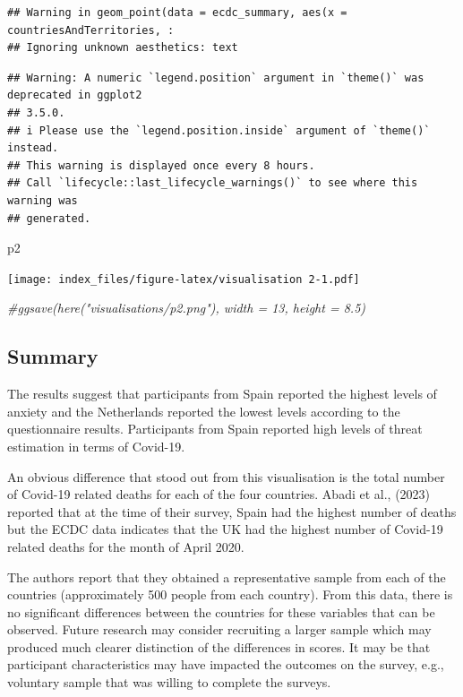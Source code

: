 \documentclass[
]{article}
\newenvironment{Shaded}{\begin{snugshade}}{\end{snugshade}}
\newcommand{\CommentTok}[1]{\textcolor[rgb]{0.56,0.35,0.01}{\textit{#1}}}
\newcommand{\NormalTok}[1]{#1}
\begin{document}
\begin{verbatim}
## Warning in geom_point(data = ecdc_summary, aes(x = countriesAndTerritories, :
## Ignoring unknown aesthetics: text
\end{verbatim}

\begin{verbatim}
## Warning: A numeric `legend.position` argument in `theme()` was deprecated in ggplot2
## 3.5.0.
## i Please use the `legend.position.inside` argument of `theme()` instead.
## This warning is displayed once every 8 hours.
## Call `lifecycle::last_lifecycle_warnings()` to see where this warning was
## generated.
\end{verbatim}

\begin{Shaded}
\begin{Highlighting}[]
\NormalTok{p2}
\end{Highlighting}
\end{Shaded}

\texttt{[image: index\_files/figure-latex/visualisation 2-1.pdf]}

\begin{Shaded}
\begin{Highlighting}[]
\CommentTok{\#ggsave(here("visualisations/p2.png"), width = 13, height = 8.5)}
\end{Highlighting}
\end{Shaded}

\subsection{Summary}\label{summary}

The results suggest that participants from Spain reported the highest
levels of anxiety and the Netherlands reported the lowest levels
according to the questionnaire results. Participants from Spain reported
high levels of threat estimation in terms of Covid-19.

An obvious difference that stood out from this visualisation is the
total number of Covid-19 related deaths for each of the four countries.
Abadi et al., (2023) reported that at the time of their survey, Spain
had the highest number of deaths but the ECDC data indicates that the UK
had the highest number of Covid-19 related deaths for the month of April
2020.

The authors report that they obtained a representative sample from each
of the countries (approximately 500 people from each country). From this
data, there is no significant differences between the countries for
these variables that can be observed. Future research may consider
recruiting a larger sample which may produced much clearer distinction
of the differences in scores. It may be that participant characteristics
may have impacted the outcomes on the survey, e.g., voluntary sample
that was willing to complete the surveys.
\end{document}
